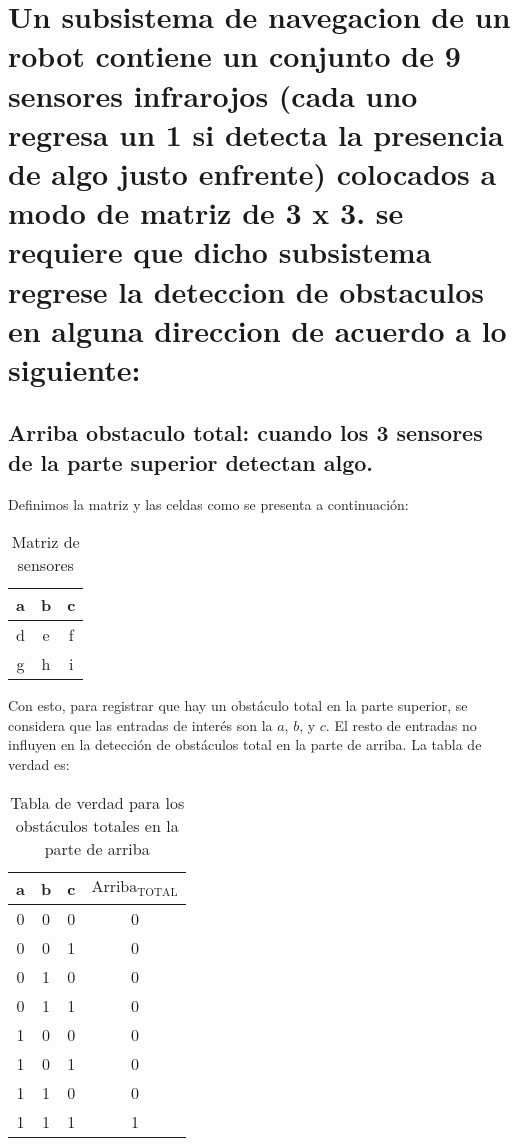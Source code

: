 \section{Un subsistema de navegacion de un robot contiene un conjunto de 9 sensores infrarojos (cada uno regresa un 1 si detecta la presencia de algo justo enfrente) colocados a modo de matriz de 3 x 3. se requiere que dicho subsistema regrese la deteccion de obstaculos en alguna direccion de acuerdo a lo siguiente:}
\subsection{Arriba obstaculo total: cuando los 3 sensores de la parte superior detectan algo.}
Definimos la matriz y las celdas como se presenta a continuación:
\begin{table}[!ht]
    \centering
    \begin{tabular}{|c|c|c|}
        \hline
        a & b & c \\
        \hline
        d & e & f \\
        \hline
        g & h & i \\
        \hline
    \end{tabular}
    \caption{Matriz de sensores}\label{table:matriz-sensores}
\end{table}
Con esto, para registrar que hay un obstáculo total en la parte superior, se considera que las entradas de interés son la $a$, $b$, y $c$. El resto de entradas no influyen en la detección de obstáculos total en la parte de arriba. La tabla de verdad es:

\begin{table}[!ht]
    \centering
    \begin{tabular}{|c|c|c|c|}
        \hline
        a & b & c & $\text{Arriba}_{\text{TOTAL}}$\\
        \hline
        0 & 0 & 0 & 0 \\
        \hline
        0 & 0 & 1 & 0 \\
        \hline
        0 & 1 & 0 & 0 \\
        \hline
        0 & 1 & 1 & 0 \\
        \hline
        1 & 0 & 0 & 0 \\
        \hline
        1 & 0 & 1 & 0 \\
        \hline
        1 & 1 & 0 & 0 \\
        \hline
        1 & 1 & 1 & 1 \\
        \hline
    \end{tabular}
    \caption{Tabla de verdad para los obstáculos totales en la parte de arriba}\label{table:arriba-total}
\end{table}

